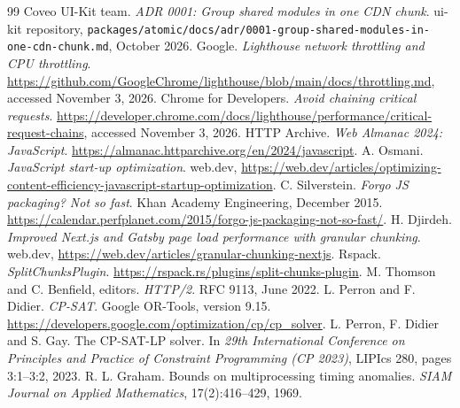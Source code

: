 \documentclass[11pt]{article}
\newcommand{\code}[1]{\texttt{#1}}
\begin{document}
\begin{thebibliography}{99}\small
{} Coveo UI-Kit team. \emph{ADR 0001: Group shared modules in one CDN chunk}. ui-kit repository, \code{packages/atomic/docs/adr/0001-group-shared-modules-in-one-cdn-chunk.md}, October 2026.
 Google. \emph{Lighthouse network throttling and CPU throttling}. \url{https://github.com/GoogleChrome/lighthouse/blob/main/docs/throttling.md}, accessed November 3, 2026.
 Chrome for Developers. \emph{Avoid chaining critical requests}. \url{https://developer.chrome.com/docs/lighthouse/performance/critical-request-chains}, accessed November 3, 2026.
 HTTP Archive. \emph{Web Almanac 2024: JavaScript}. \url{https://almanac.httparchive.org/en/2024/javascript}.
 A. Osmani. \emph{JavaScript start-up optimization}. web.dev, \url{https://web.dev/articles/optimizing-content-efficiency-javascript-startup-optimization}.
 C. Silverstein. \emph{Forgo JS packaging? Not so fast}. Khan Academy Engineering, December 2015. \url{https://calendar.perfplanet.com/2015/forgo-js-packaging-not-so-fast/}.
 H. Djirdeh. \emph{Improved Next.js and Gatsby page load performance with granular chunking}. web.dev, \url{https://web.dev/articles/granular-chunking-nextjs}.
 Rspack. \emph{SplitChunksPlugin}. \url{https://rspack.rs/plugins/split-chunks-plugin}.
 M. Thomson and C. Benfield, editors. \emph{HTTP/2}. RFC 9113, June 2022.
 L. Perron and F. Didier. \emph{CP-SAT}. Google OR-Tools, version 9.15. \url{https://developers.google.com/optimization/cp/cp_solver}.
 L. Perron, F. Didier and S. Gay. The CP-SAT-LP solver. In \emph{29th International Conference on Principles and Practice of Constraint Programming (CP 2023)}, LIPIcs 280, pages 3:1--3:2, 2023.
 R. L. Graham. Bounds on multiprocessing timing anomalies. \emph{SIAM Journal on Applied Mathematics}, 17(2):416--429, 1969.
\end{thebibliography}
\end{document}
